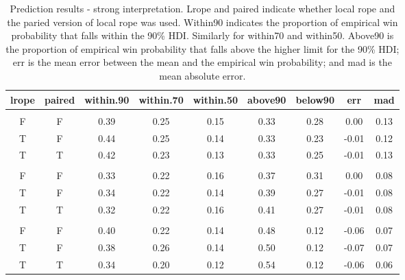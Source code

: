 \documentclass[twoside,11pt,preprint]{article}
\begin{document}
\begin{table}

\caption{\label{tab:predxz}\label{tab:preds}Prediction results - strong interpretation. Lrope and paired indicate whether local rope and the paried version of local rope was used. Within90 indicates the proportion of empirical win probability that falls within the 90\% HDI. Similarly for within70 and within50. Above90 is the proportion of empirical win probability that falls above the higher limit for the 90\% HDI; err is the mean error between the mean and the empirical win probability; and mad is the mean absolute error.}
\centering
\begin{tabular}[t]{ccccccccc}
\toprule
\textbf{lrope} & \textbf{paired} & \textbf{within.90} & \textbf{within.70} & \textbf{within.50} & \textbf{above90} & \textbf{below90} & \textbf{err} & \textbf{mad}\\
\midrule
\addlinespace[0.3em]
\multicolumn{9}{l}{\textbf{ss}}\\
\hspace{1em}F & F & 0.39 & 0.25 & 0.15 & 0.33 & 0.28 & 0.00 & 0.13\\
\hspace{1em}T & F & 0.44 & 0.25 & 0.14 & 0.33 & 0.23 & -0.01 & 0.12\\
\hspace{1em}T & T & 0.42 & 0.23 & 0.13 & 0.33 & 0.25 & -0.01 & 0.13\\
\addlinespace[0.3em]
\multicolumn{9}{l}{\textbf{mm}}\\
\hspace{1em}F & F & 0.33 & 0.22 & 0.16 & 0.37 & 0.31 & 0.00 & 0.08\\
\hspace{1em}T & F & 0.34 & 0.22 & 0.14 & 0.39 & 0.27 & -0.01 & 0.08\\
\hspace{1em}T & T & 0.32 & 0.22 & 0.16 & 0.41 & 0.27 & -0.01 & 0.08\\
\addlinespace[0.3em]
\multicolumn{9}{l}{\textbf{sl}}\\
\hspace{1em}F & F & 0.40 & 0.22 & 0.14 & 0.48 & 0.12 & -0.06 & 0.07\\
\hspace{1em}T & F & 0.38 & 0.26 & 0.14 & 0.50 & 0.12 & -0.07 & 0.07\\
\hspace{1em}T & T & 0.34 & 0.20 & 0.12 & 0.54 & 0.12 & -0.06 & 0.06\\
\bottomrule
\end{tabular}
\end{table}
\end{document}
